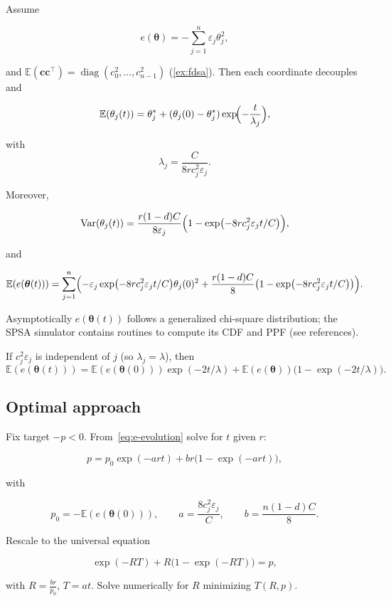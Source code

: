 \documentclass[11pt]{article}
\providecommand{\Cref}[1]{\autoref{#1}}
\theoremstyle{plain}
\theoremstyle{definition}
\theoremstyle{remark}
\newcommand{\E}{\mathbb{E}}
\DeclareMathOperator{\diag}{diag}
\DeclareMathOperator{\Var}{Var}
\begin{document}
Assume


\[
  e(\bm{\theta})=-\sum_{j=1}^n \varepsilon_j\theta_j^2,
\]


and $\E(\bm{c}\bm{c}^\top)=\diag(c_0^2,\dots,c_{n-1}^2)$ (\Cref{ex:fdsa}). Then each coordinate decouples and


\[
  \E(\theta_j(t))=\theta_j^\ast + (\theta_j(0)-\theta_j^\ast)\exp\!\Bigl(-\frac{t}{\lambda_j}\Bigr),
\]


with
\begin{equation}
  \lambda_j=\frac{C}{8r c_j^2\varepsilon_j}.
  \label{eq:lambda_j}
\end{equation}

Moreover,


\[
  \Var(\theta_j(t))=\frac{r(1-d)C}{8\varepsilon_j}\Bigl(1-\exp\bigl(-8r c_j^2\varepsilon_j t/C\bigr)\Bigr),
\]


and


\[
  \E(e(\bm{\theta}(t)))=\sum_{j=1}^n\Bigl(-\varepsilon_j\exp\bigl(-8r c_j^2\varepsilon_j t/C\bigr)\theta_j(0)^2 + \frac{r(1-d)C}{8}\bigl(1-\exp\bigl(-8r c_j^2\varepsilon_j t/C\bigr)\bigr)\Bigr).
\]



Asymptotically $e(\bm{\theta}(t))$ follows a generalized chi-square distribution; the SPSA simulator contains routines to compute its CDF and PPF (see references).

If $c_j^2\varepsilon_j$ is independent of $j$ (so $\lambda_j=\lambda$), then
\begin{equation}
  \E(e(\bm{\theta}(t)))=\E(e(\bm{\theta}(0)))\exp(-2t/\lambda)+\E(e(\bm{\theta}))\bigl(1-\exp(-2t/\lambda)\bigr).
  \label{eq:e-evolution}
\end{equation}

\subsection{Optimal approach}

Fix target $-p<0$. From~\eqref{eq:e-evolution} solve for $t$ given $r$:


\[
  p = p_0\exp(-a r t) + b r\bigl(1-\exp(-a r t)\bigr),
\]


with


\[
  p_0=-\E(e(\bm{\theta}(0))),\qquad a=\frac{8c_j^2\varepsilon_j}{C},\qquad b=\frac{n(1-d)C}{8}.
\]


Rescale to the universal equation


\[
  \exp(-RT)+R\bigl(1-\exp(-RT)\bigr)=p,
\]


with $R=\frac{br}{p_0}$, $T=at$. Solve numerically for $R$ minimizing $T(R,p)$.
\end{document}

